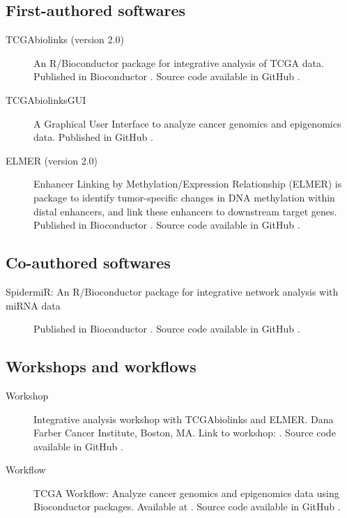 \subsection{First-authored softwares}
\begin{description}
	\item[TCGAbiolinks (version 2.0)] An R/Bioconductor package for integrative analysis of TCGA data. Published in Bioconductor . Source code available in GitHub .
    \item[TCGAbiolinksGUI] A Graphical User Interface to analyze cancer genomics and epigenomics data. Published in GitHub .
    \item[ELMER (version 2.0)] Enhancer Linking by Methylation/Expression Relationship (ELMER) is package to identify tumor-specific changes in DNA methylation within distal enhancers, and link these enhancers to downstream target genes. Published in Bioconductor . Source code available in GitHub  .
\end{description}

\subsection{Co-authored softwares}
\begin{description}
	\item[SpidermiR: An R/Bioconductor package for integrative network analysis with miRNA data]{Published in Bioconductor . Source code available in GitHub }.
\end{description}


\subsection{Workshops and workflows}
\begin{description}
\item[Workshop]{Integrative analysis workshop with TCGAbiolinks and ELMER. Dana Farber Cancer Institute, Boston, MA. Link to workshop: . Source code available in GitHub .}
\item[Workflow]{TCGA Workflow: Analyze cancer genomics and epigenomics data using Bioconductor packages. Available at . Source code available in GitHub .}

\end{description}

